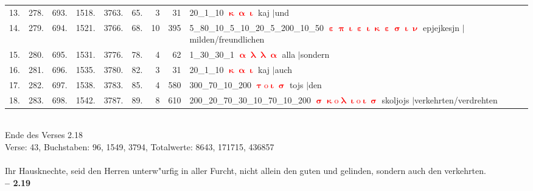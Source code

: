 \documentclass[a4paper,10pt,landscape]{article}
\begin{document}
\begin{tabular}{rrrrrrrrp{120mm}}
13.&278.&693.&1518.&3763.&65.&3&31&20\_1\_10 \textcolor{red}{$\boldsymbol{\upkappa\upalpha\upiota}$} kaj $|$und\\
14.&279.&694.&1521.&3766.&68.&10&395&5\_80\_10\_5\_10\_20\_5\_200\_10\_50 \textcolor{red}{$\boldsymbol{\upepsilon\uppi\upiota\upepsilon\upiota\upkappa\upepsilon\upsigma\upiota\upnu}$} epjejkesjn $|$milden/freundlichen\\
15.&280.&695.&1531.&3776.&78.&4&62&1\_30\_30\_1 \textcolor{red}{$\boldsymbol{\upalpha\uplambda\uplambda\upalpha}$} alla $|$sondern\\
16.&281.&696.&1535.&3780.&82.&3&31&20\_1\_10 \textcolor{red}{$\boldsymbol{\upkappa\upalpha\upiota}$} kaj $|$auch\\
17.&282.&697.&1538.&3783.&85.&4&580&300\_70\_10\_200 \textcolor{red}{$\boldsymbol{\uptau\mathrm{o}\upiota\upsigma}$} tojs $|$den\\
18.&283.&698.&1542.&3787.&89.&8&610&200\_20\_70\_30\_10\_70\_10\_200 \textcolor{red}{$\boldsymbol{\upsigma\upkappa\mathrm{o}\uplambda\upiota\mathrm{o}\upiota\upsigma}$} skoljojs $|$verkehrten/verdrehten\\
\end{tabular}\medskip \\
Ende des Verses 2.18\\
Verse: 43, Buchstaben: 96, 1549, 3794, Totalwerte: 8643, 171715, 436857\\
\\
Ihr Hausknechte, seid den Herren unterw"urfig in aller Furcht, nicht allein den guten und gelinden, sondern auch den verkehrten.\\
\newpage 
{\bf -- 2.19}\\
\medskip \\
\end{document}
